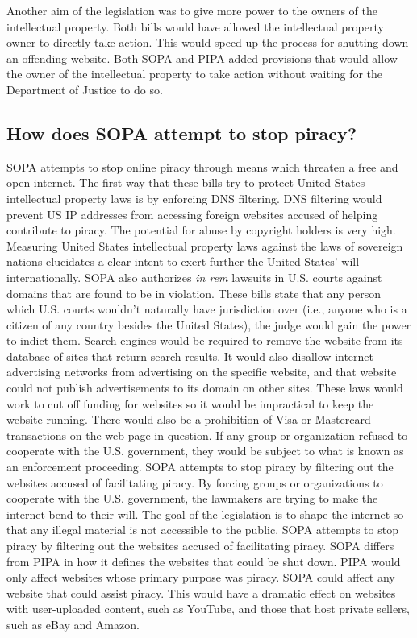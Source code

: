 \documentclass[11pt,journal,compsoc]{IEEEtran}
\begin{document}
Another aim of the legislation was to give more power to the owners of the intellectual property. Both bills would have allowed the intellectual property owner to directly take action. This would speed up the process for shutting down an offending website. Both SOPA and PIPA added provisions that would allow the owner of the intellectual property to take action without waiting for the Department of Justice to do so. 


\subsection{How does SOPA attempt to stop piracy?}
SOPA attempts to stop online piracy through means which threaten a free and open internet. The first way that these bills try to protect United States intellectual property laws is by enforcing DNS filtering. DNS filtering would prevent US IP addresses from accessing foreign websites accused of helping contribute to piracy. The potential for abuse by copyright holders is very high. Measuring United States intellectual property laws against the laws of sovereign nations elucidates a clear intent to exert further the United States' will internationally. SOPA also authorizes \textit{in rem} lawsuits in U.S. courts against domains that are found to be in violation. These bills state that any person which U.S. courts wouldn't naturally have jurisdiction over (i.e., anyone who is a citizen of any country besides the United States), the judge would gain the power to indict them. Search engines would be required to remove the website from its database of sites that return search results. It would also disallow internet advertising networks from advertising on the specific website, and that website could not publish advertisements to its domain on other sites. These laws would work to cut off funding for websites so it would be impractical to keep the website running. There would also be a prohibition of Visa or Mastercard transactions on the web page in question. If any group or organization refused to cooperate with the U.S. government, they would be subject to what is known as an enforcement proceeding. SOPA attempts to stop piracy by filtering out the websites accused of facilitating piracy. By forcing groups or organizations to cooperate with the U.S. government, the lawmakers are trying to make the internet bend to their will. The goal of the legislation is to shape the internet so that any illegal material is not accessible to the public. SOPA attempts to stop piracy by filtering out the websites accused of facilitating piracy.
SOPA differs from PIPA in how it defines the websites that could be shut down. PIPA would only affect websites whose primary purpose was piracy. SOPA could affect any website that could assist piracy. This would have a dramatic effect on websites with user-uploaded content, such as YouTube, and those that host private sellers, such as eBay and Amazon. 
\end{document}
